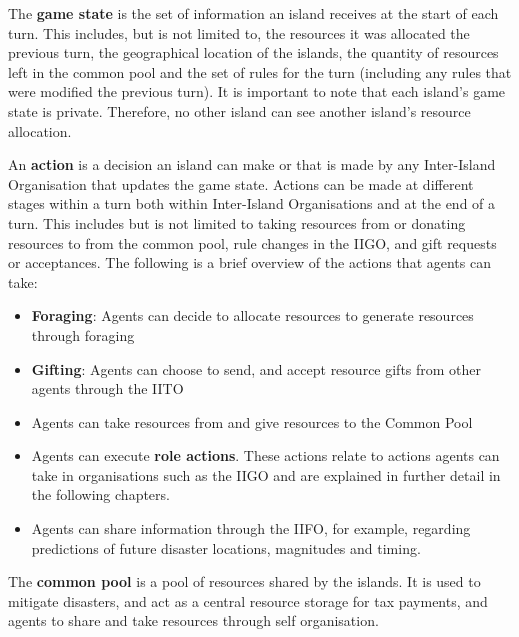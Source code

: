 \begin{definition} \label{def:gamestate}
    The \textbf{game state} is the set of information an island receives at the start of each turn. This includes, but is not limited to, the resources it was allocated the previous turn, the geographical location of the islands, the quantity of resources left in the common pool and the set of rules for the turn (including any rules that were modified the previous turn). It is important to note that each island's game state is private. Therefore, no other island can see another island's resource allocation.
\end{definition}

\begin{definition} \label{def:gameaction}
    An \textbf{action} is a decision an island can make or that is made by any Inter-Island Organisation that updates the game state. Actions can be made at different stages within a turn both within Inter-Island Organisations and at the end of a turn. This includes but is not limited to taking resources from or donating resources to from the common pool, rule changes in the IIGO, and gift requests or acceptances. The following is a brief overview of the actions that agents can take:

    \begin{itemize}
        \item \textbf{Foraging}: Agents can decide to allocate resources to generate resources through foraging
        \item \textbf{Gifting}: Agents can choose to send, and accept resource gifts from other agents through the IITO
        \item Agents can take resources from and give resources to the Common Pool
        \item Agents can execute \textbf{role actions}. These actions relate to actions agents can take in organisations such as the IIGO and are explained in further detail in the following chapters.
        \item Agents can share information through the IIFO, for example, regarding predictions of future disaster locations, magnitudes and timing.
    \end{itemize}
\end{definition}

\begin{definition} \label{def:gameseason}
    The \textbf{common pool} is a pool of resources shared by the islands. It is used to mitigate disasters, and act as a central resource storage for tax payments, and agents to share and take resources through self organisation.
\end{definition}

